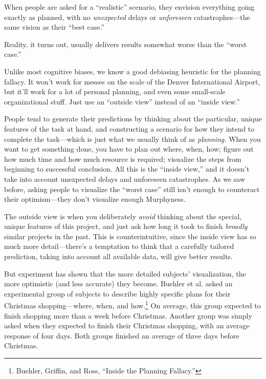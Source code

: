 {
 When people are asked for a
``realistic'' scenario, they
envision everything going exactly as planned, with no
\textit{unexpected} delays or \textit{unforeseen} catastrophes---the
same vision as their ``best case.''}

{
 Reality, it turns out, usually delivers results somewhat worse
than the ``worst case.''}

{
 Unlike most cognitive biases, we know a good debiasing heuristic
for the planning fallacy. It won't work for messes on
the scale of the Denver International Airport, but
it'll work for a lot of personal planning, and even
some small-scale organizational stuff. Just use an
``outside view'' instead of an
``inside view.''}

{
 People tend to generate their predictions by thinking about the
particular, unique features of the task at hand, and constructing a
scenario for how they intend to complete the task---which is just what
we usually think of as \textit{planning.} When you want to get
something done, you have to plan out where, when, how; figure out how
much time and how much resource is required; visualize the steps from
beginning to successful conclusion. All this is the
``inside view,'' and it
doesn't take into account unexpected delays and
unforeseen catastrophes. As we saw before, asking people to visualize
the ``worst case'' still
isn't enough to counteract their optimism---they
don't visualize enough Murphyness.}

{
 The outside view is when you deliberately \textit{avoid} thinking
about the special, unique features of this project, and just ask how
long it took to finish \textit{broadly} similar projects in the past.
This is counterintuitive, since the inside view has so much more
detail---there's a temptation to think that a carefully
tailored prediction, taking into account all available data, will give
better results.}

{
 But experiment has shown that the more detailed
subjects' visualization, the more optimistic (and less
accurate) they become. Buehler et al. asked an experimental group of
subjects to describe highly specific plans for their Christmas
shopping---where, when, and how.\footnote{Buehler, Griffin, and Ross, ``Inside the
Planning Fallacy.''} On average, this
group expected to finish shopping more than a week before Christmas.
Another group was simply asked when they expected to finish their
Christmas shopping, with an average response of four days. Both groups
finished an average of three days before Christmas.}

